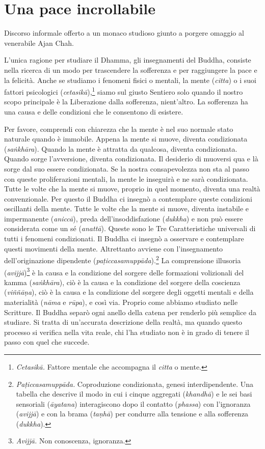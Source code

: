 \chapter{Una pace incrollabile}

\begin{openingQuote}
  \centering

  Discorso informale offerto a un monaco studioso giunto a porgere omaggio al
  venerabile Ajan Chah.
\end{openingQuote}

L'unica ragione per studiare il Dhamma, gli insegnamenti del Buddha,
consiste nella ricerca di un modo per trascendere la sofferenza e per
raggiungere la pace e la felicità. Anche se studiamo i fenomeni fisici o
mentali, la mente (\emph{citta}) o i suoi fattori psicologici
(\emph{cetasikā}),\footnote{\emph{Cetasikā.} Fattore mentale che
  accompagna il \emph{citta} o mente.} siamo sul giusto Sentiero solo
quando il nostro scopo principale è la Liberazione dalla sofferenza,
nient'altro. La sofferenza ha una causa e delle condizioni che le
consentono di esistere.

Per favore, comprendi con chiarezza che la mente è nel suo normale stato
naturale quando è immobile. Appena la mente si muove, diventa
condizionata (\emph{saṅkhāra}). Quando la mente è attratta da qualcosa,
diventa condizionata. Quando sorge l'avversione, diventa condizionata.
Il desiderio di muoversi qua e là sorge dal suo essere condizionata. Se
la nostra consapevolezza non sta al passo con queste proliferazioni
mentali, la mente le inseguirà e ne sarà condizionata. Tutte le volte
che la mente si muove, proprio in quel momento, diventa una realtà
convenzionale. Per questo il Buddha ci insegnò a contemplare queste
condizioni oscillanti della mente. Tutte le volte che la mente si muove,
diventa instabile e impermanente (\emph{aniccā}), preda
dell'insoddisfazione (\emph{dukkha}) e non può essere considerata come
un sé (\emph{anattā}). Queste sono le Tre Caratteristiche universali di
tutti i fenomeni condizionati. Il Buddha ci insegnò a osservare e
contemplare questi movimenti della mente. Altrettanto avviene con
l'insegnamento dell'originazione dipendente
(\emph{paṭiccasamuppāda}).\footnote{\emph{Paṭiccasamuppāda.}
  Coproduzione condizionata, genesi interdipendente. Una tabella che
  descrive il modo in cui i cinque aggregati (\emph{khandhā}) e le sei
  basi sensoriali (\emph{āyatana}) interagiscono dopo il contatto
  (\emph{phassa}) con l'ignoranza (\emph{avijjā}) e con la brama
  (\emph{taṇhā}) per condurre alla tensione e alla sofferenza
  (\emph{dukkha}).} La comprensione illusoria (\emph{avijjā})\footnote{\emph{Avijjā.}
  Non conoscenza, ignoranza.} è la causa e la condizione del sorgere
delle formazioni volizionali del kamma (\emph{saṅkhāra}), ciò è
la causa e la condizione del sorgere della coscienza (\emph{viññāṇa}),
ciò è la causa e la condizione del sorgere degli oggetti mentali e della
materialità (\emph{nāma} e \emph{rūpa}), e così via. Proprio come
abbiamo studiato nelle Scritture. Il Buddha separò ogni anello della
catena per renderlo più semplice da studiare. Si tratta di un'accurata
descrizione della realtà, ma quando questo processo si verifica nella
vita reale, chi l'ha studiato non è in grado di tenere il passo con quel
che succede.

